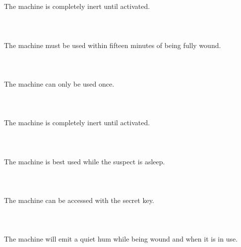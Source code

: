 \documentclass{article}
\begin{document}
    \section{}
    The machine is completely inert until activated.\\\\ 
    \newpage
    
    \section{}
    The machine must be used within fifteen minutes of being fully wound.\\\\ 
    \newpage
    
    \section{}
    The machine can only be used once.\\\\ 
    \newpage
    
    \section{}
    The machine is completely inert until activated.\\\\ 
    \newpage
    
    \section{}
    The machine is best used while the suspect is asleep.\\\\ 
    \newpage
    
    \section{}
    The machine can be accessed with the secret key.\\\\ 
    \newpage
    
    \section{}
    The machine will emit a quiet hum while being wound and when it is in use.\\\\ 
    \newpage
    
\end{document}
